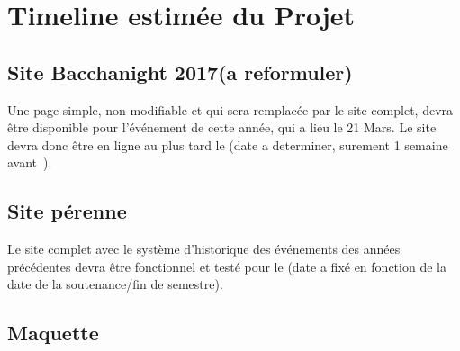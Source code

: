 \documentclass[12pt]{article}
\begin{document}

\section{Timeline estimée du Projet}

\subsection*{Site Bacchanight 2017(a reformuler)}
  Une page simple, non modifiable et qui sera remplacée par le site complet, devra être disponible pour l'événement de cette année, qui a lieu le 21 Mars. Le site devra donc être en ligne au plus tard le (date a determiner, surement 1 semaine avant~).

\subsection*{Site pérenne}
  Le site complet avec le système d'historique des événements des années précédentes devra être fonctionnel et testé pour le (date a fixé en fonction de la date de la soutenance/fin de semestre).
\newpage

\subsection*{Maquette}
\end{document}
